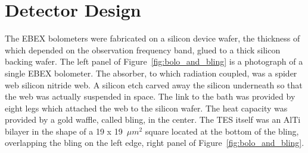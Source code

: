 


\section{Detector Design}
\label{sec:detector_design}

The \ac{EBEX} bolometers were fabricated on a silicon device wafer, the thickness of which depended on the observation frequency band, glued to a thick silicon backing wafer.
The left panel of Figure~\ref{fig:bolo_and_bling} is a photograph of a single \ac{EBEX} bolometer. 
The absorber, to which radiation coupled, was a spider web silicon nitride web. 
A silicon etch carved away the silicon underneath so that the web was actually suspended in space.
The link to the bath was provided by eight legs which attached the web to the silicon wafer. 
The heat capacity was provided by a gold waffle, called bling, in the center. 
The \ac{TES} itself was an AlTi bilayer in the shape of a 19 x 19~$\mu m^{2}$ square located at the bottom of the bling, overlapping the bling on the left edge, right panel of Figure~\ref{fig:bolo_and_bling}.


